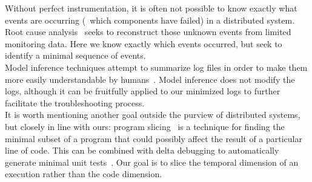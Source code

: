 %
 Without perfect instrumentation,
it is often not possible to know exactly what events are occurring (\eg~which
components have failed) in a
distributed system. Root cause analysis~\cite{yemini1996,Kandula:2009:DDE:1592568.1592597}
seeks to reconstruct those unknown events from limited monitoring data.
Here we know exactly which events occurred, but
seek to identify a minimal sequence of events.\\[0.5ex]
%
 Model inference techniques attempt to summarize log files
in order to make them more easily understandable by
humans~\cite{synoptic,csight,biermann1972synthesis,lorenzoli2008automatic,lou2010mining}.
Model inference does not modify the logs, although
it can be fruitfully applied to our minimized logs to further facilitate the
troubleshooting process.\\[0.5ex]
%
 It is worth mentioning another goal outside the purview of distributed systems, but
closely in line with ours: program slicing~\cite{weiser1981program} is a
technique for finding the
minimal subset of a program that could possibly affect the result of a particular line of code.
This can be combined with delta debugging to automatically generate minimal unit tests~\cite{burger2011minimizing}.
Our goal is to slice the temporal dimension of an execution rather than the
code dimension.

